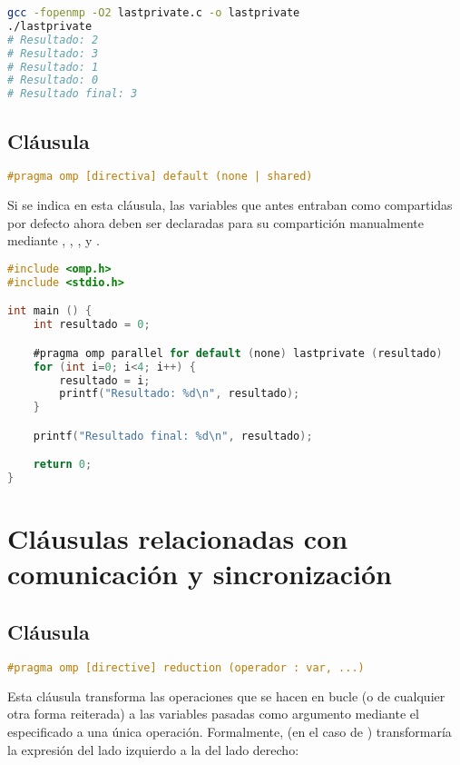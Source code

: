 \begin{lstlisting}[language=sh]
gcc -fopenmp -O2 lastprivate.c -o lastprivate
./lastprivate
# Resultado: 2
# Resultado: 3
# Resultado: 1
# Resultado: 0
# Resultado final: 3
\end{lstlisting}

\subsection{Cláusula }

\begin{lstlisting}[language=C]
#pragma omp [directiva] default (none | shared)
\end{lstlisting}

Si se indica  en esta cláusula, las variables que antes entraban como compartidas por defecto ahora deben ser declaradas para su compartición manualmente mediante , , ,  y .

\begin{lstlisting}[language=C]
#include <omp.h>
#include <stdio.h>

int main () {
	int resultado = 0;

	#pragma omp parallel for default (none) lastprivate (resultado)
	for (int i=0; i<4; i++) {
		resultado = i;
		printf("Resultado: %d\n", resultado);
	}

	printf("Resultado final: %d\n", resultado);

	return 0;
}
\end{lstlisting}

\section{Cláusulas relacionadas con comunicación y sincronización}

\subsection{Cláusula }

\begin{lstlisting}[language=C]
#pragma omp [directive] reduction (operador : var, ...)
\end{lstlisting}

Esta cláusula transforma las operaciones que se hacen en bucle (o de cualquier otra forma reiterada) a las variables pasadas como argumento mediante el  especificado a una única operación.
Formalmente,  (en el caso de ) transformaría la expresión del lado izquierdo a la del lado derecho:

